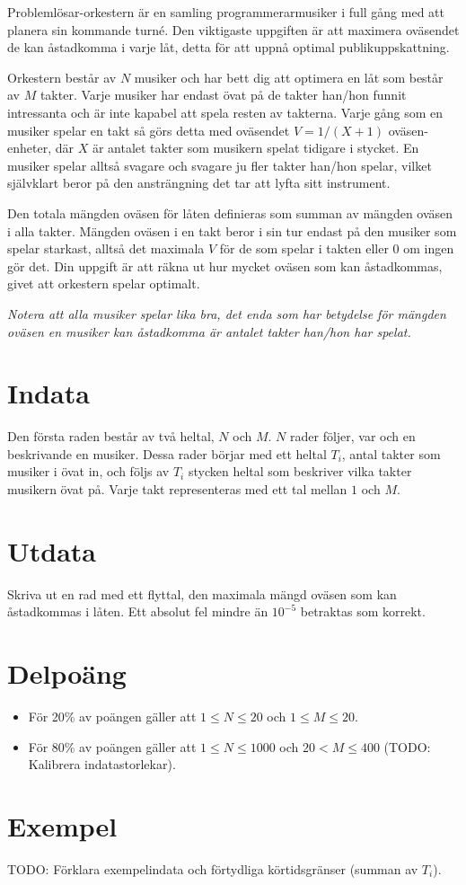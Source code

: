 
Problemlösar-orkestern är en samling programmerarmusiker i full gång med att planera sin kommande turné. Den viktigaste uppgiften är att maximera oväsendet de kan åstadkomma i varje låt, detta för att uppnå optimal publikuppskattning.

Orkestern består av $N$ musiker och har bett dig att optimera en låt som består av $M$ takter. Varje musiker har endast övat på de takter han/hon funnit intressanta och är inte kapabel att spela resten av takterna. Varje gång som en musiker spelar en takt så görs detta med oväsendet $V=1/(X+1)$ oväsen-enheter, där $X$ är antalet takter som musikern spelat tidigare i stycket. En musiker spelar alltså svagare och svagare ju fler takter han/hon spelar, vilket självklart beror på den ansträngning det tar att lyfta sitt instrument.

Den totala mängden oväsen för låten definieras som summan av mängden oväsen i alla takter. Mängden oväsen i en takt beror i sin tur endast på den musiker som spelar starkast, alltså det maximala $V$ för de som spelar i takten eller $0$ om ingen gör det. Din uppgift är att räkna ut hur mycket oväsen som kan åstadkommas, givet att orkestern spelar optimalt.

\emph{Notera att alla musiker spelar lika bra, det enda som har betydelse för mängden oväsen en musiker kan åstadkomma är antalet takter han/hon har spelat.}

\section*{Indata}
Den första raden består av två heltal, $N$ och $M$. $N$ rader följer, var och en beskrivande en musiker. Dessa rader börjar med ett heltal $T_i$, antal takter som musiker i övat in, och följs av $T_i$ stycken heltal som beskriver vilka takter musikern övat på. Varje takt representeras med ett tal mellan $1$ och $M$.

\section*{Utdata}
Skriva ut en rad med ett flyttal, den maximala mängd oväsen som kan åstadkommas i låten. Ett absolut fel mindre än $10^{-5}$ betraktas som korrekt.

\section*{Delpoäng}
\begin{itemize}
\item För 20\% av poängen gäller att $1 \leq N \leq 20$ och $1 \leq M \leq 20$.
\item För 80\% av poängen gäller att $1 \leq N \leq 1000$ och $20 < M \leq 400$ (TODO: Kalibrera indatastorlekar).
\end{itemize}

\section*{Exempel}
TODO: Förklara exempelindata och förtydliga körtidsgränser (summan av $T_i$).
